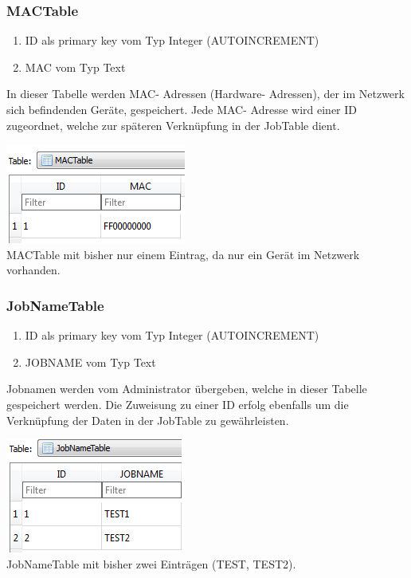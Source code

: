 \documentclass[12pt,a4paper]{report}
\begin{document}
\begin{onehalfspace}
\subsubsection{MACTable}
\begin{enumerate}
\item ID als primary key vom Typ Integer (AUTOINCREMENT)
\item MAC vom Typ Text
\end{enumerate}
In dieser Tabelle werden MAC- Adressen (Hardware- Adressen), der im Netzwerk sich befindenden Geräte, gespeichert. Jede MAC- Adresse wird einer ID zugeordnet, welche zur späteren Verknüpfung in der JobTable dient.
\begin{center}
\includegraphics[scale=0.8]{img/db-tb-mac.png}\\
MACTable mit bisher nur einem Eintrag, da nur ein Gerät im Netzwerk vorhanden.
\end{center}
\subsubsection{JobNameTable}
\begin{enumerate}
\item ID als primary key vom Typ Integer (AUTOINCREMENT)
\item JOBNAME vom Typ Text
\end{enumerate}
Jobnamen werden vom Administrator übergeben, welche in dieser Tabelle gespeichert werden. Die Zuweisung zu einer ID erfolg ebenfalls um die Verknüpfung der Daten in der JobTable zu gewährleisten.
\begin{center}
\includegraphics[scale=0.8]{img/db-tb-jobname.png}\\
JobNameTable mit bisher zwei Einträgen (TEST, TEST2).
\end{center}

\end{onehalfspace}
\end{document}
